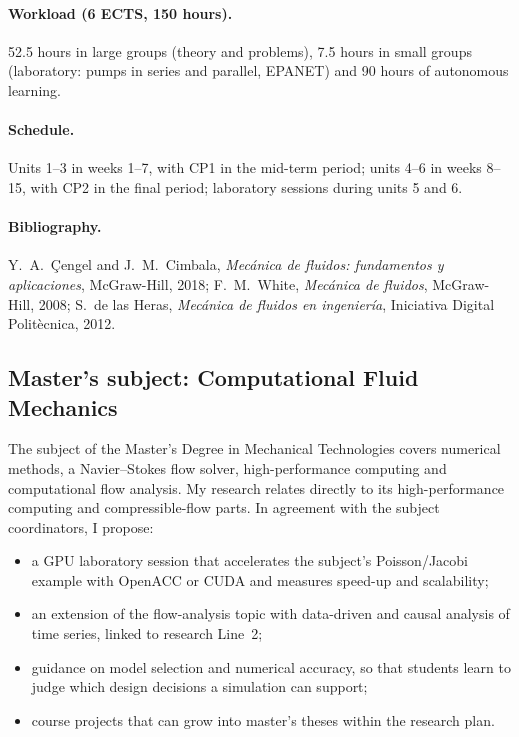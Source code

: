 \documentclass[11pt]{article}
\begin{document}
\paragraph{Workload (6 ECTS, 150 hours).} 52.5 hours in large groups (theory and
problems), 7.5 hours in small groups (laboratory: pumps in series and parallel, EPANET) and
90 hours of autonomous learning.

\paragraph{Schedule.} Units 1--3 in weeks 1--7, with CP1 in the mid-term period; units
4--6 in weeks 8--15, with CP2 in the final period; laboratory sessions during units 5 and
6.

\paragraph{Bibliography.} Y.\ A.\ \c{C}engel and J.\ M.\ Cimbala, \emph{Mec\'anica de
fluidos: fundamentos y aplicaciones}, McGraw-Hill, 2018; F.\ M.\ White, \emph{Mec\'anica de
fluidos}, McGraw-Hill, 2008; S.\ de las Heras, \emph{Mec\'anica de fluidos en
ingenier\'ia}, Iniciativa Digital Polit\`ecnica, 2012.

\subsection{Master's subject: Computational Fluid Mechanics}\label{sec:cfm}
The subject of the Master's Degree in Mechanical Technologies covers numerical methods, a
Navier--Stokes flow solver, high-performance computing and computational flow analysis.
My research relates directly to its high-performance computing and compressible-flow
parts. In agreement with the subject coordinators, I propose:
\begin{itemize}
  \item a GPU laboratory session that accelerates the subject's Poisson/Jacobi example
  with OpenACC or CUDA and measures speed-up and scalability;
  \item an extension of the flow-analysis topic with data-driven and causal analysis of
  time series, linked to research Line~2;
  \item guidance on model selection and numerical accuracy, so that students learn to judge
  which design decisions a simulation can support;
  \item course projects that can grow into master's theses within the research plan.
\end{itemize}
\end{document}
